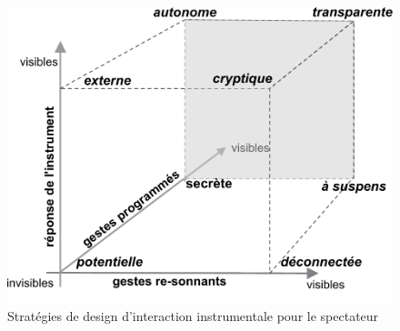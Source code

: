 
\begin{figure}[!htbp]
	\captionsetup{format=plain}%
	\centering
	\begin{minipage}[t]{0.8\textwidth}
		\includegraphics[width=\linewidth]{gfx/03_gesture/SubversiveCube.pdf}
		\caption[Stratégies de design d'interaction instrumentale pour le spectateur]{Stratégies de design d'interaction instrumentale pour le spectateur}
		\label{fig:gesture:expressive-space}
	\end{minipage}
\end{figure}

